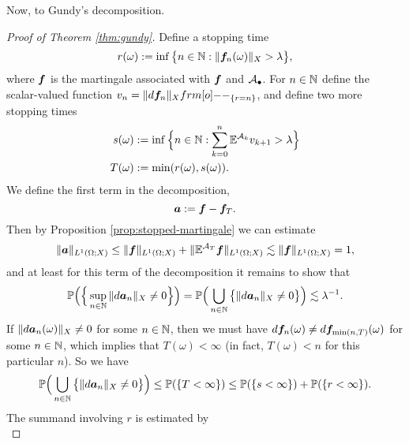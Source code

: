 Now, to Gundy's decomposition.

\begin{proof}[Proof of Theorem \ref{thm:gundy}]
  Define a stopping time
  \begin{equation*}
    r(\omega) := \inf\big\{ n \in \mathbb{N} : \|\bm{f}_{n}(\omega)\|_{X} > \lambda \big\},
  \end{equation*}
  where $\bm{f}$ is the martingale associated with $\bm{f}$ and $\mathcal{A}_{\bullet}$.
  For $n \in \mathbb{N}$ define the scalar-valued function $v_{n} = \|d\mb{f}_{n}\|_{X} \1_{\{r = n\}}$, and define two more stopping times
  \begin{equation*}
    \begin{aligned}
      s(\omega) &:= \inf\Big\{ n \in \mathbb{N} : \sum_{k=0}^{n} \mathbb{E}^{\mathcal{A}_{k}} v_{k+1} > \lambda \Big\} \\
      T(\omega) &:= \min(r(\omega), s(\omega)).
    \end{aligned}
  \end{equation*}
  We define the first term in the decomposition,
  \begin{equation*}
    \bm{a} := \bm{f} - \bm{f}_{T}.
  \end{equation*}
  Then by Proposition \ref{prop:stopped-martingale} we can estimate
  \begin{equation}\label{eq:a-1stest}
    \|\bm{a}\|_{L^1(\Omega;X)} \leq \|\bm{f}\|_{L^1(\Omega;X)} + \|\mathbb{E}^{\mathcal{A}_{T}}\bm{f}\|_{L^1(\Omega;X)}
    \lesssim \|\bm{f}\|_{L^1(\Omega;X)} = 1,
  \end{equation}
  and at least for this term of the decomposition it remains to show that
  \begin{equation}\label{eq:a-2ndest}
    \mathbb{P}\Big(\Big\{\sup_{n \in \mathbb{N}} \|d\bm{a}_{n}\|_{X} \neq 0\Big\}\Big) = \mathbb{P}\Big(\bigcup_{n \in \mathbb{N}} \big\{\|d\bm{a}_{n}\|_{X} \neq 0\big\}\Big) \lesssim \lambda^{-1}.
  \end{equation}
  If $\|d\bm{a}_{n}(\omega)\|_{X} \neq 0$ for some $n \in \mathbb{N}$, then we must have $d\bm{f}_{n}(\omega) \neq d\bm{f}_{\min(n,T)}(\omega)$ for some $n \in \mathbb{N}$, which implies that $T(\omega) < \infty$ (in fact, $T(\omega) < n$ for this particular $n$).
  So we have
  \begin{equation*}
    \mathbb{P}\Big(\bigcup_{n \in \mathbb{N}} \big\{\|d\bm{a}_{n}\|_{X} \neq 0\big\}\Big) \leq \mathbb{P}(\{T < \infty\}) \leq \mathbb{P}(\{s < \infty\}) + \mathbb{P}(\{r < \infty\}).
  \end{equation*}
  The summand involving $r$ is estimated by
  \begin{equation}\label{eq:a-rest}

\end{equation}
\end{proof}
